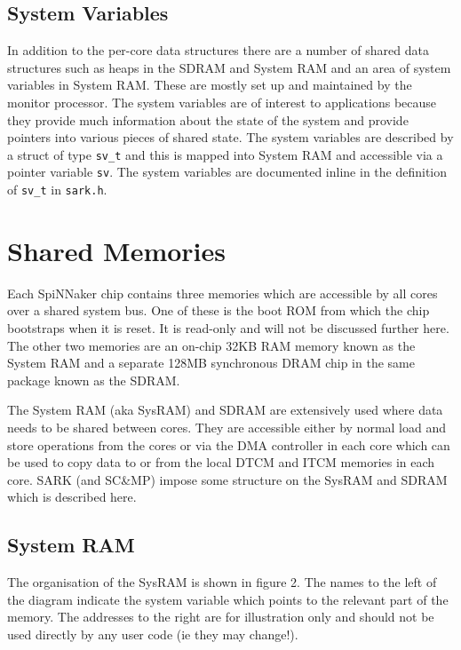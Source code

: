 \subsection{System Variables}

In addition to the per-core data structures there are a number of
shared data structures such as heaps in the SDRAM and System RAM and
an area of system variables in System RAM. These are mostly set up and
maintained by the monitor processor. The system variables are of
interest to applications because they provide much information about
the state of the system and provide pointers into various pieces of
shared state. The system variables are described by a struct of type
\texttt{sv\_t} and this is mapped into System RAM and accessible via
a pointer variable \texttt{sv}. The system variables are documented
inline in the definition of \texttt{sv\_t} in \texttt{sark.h}.

\section{Shared Memories}

Each SpiNNaker chip contains three memories which are accessible by
all cores over a shared system bus. One of these is the boot ROM from
which the chip bootstraps when it is reset. It is read-only and will
not be discussed further here. The other two memories are an on-chip
32KB RAM memory known as the System RAM and a separate 128MB
synchronous DRAM chip in the same package known as the SDRAM.

The System RAM (aka SysRAM) and SDRAM are extensively used where data
needs to be shared between cores. They are accessible either by normal
load and store operations from the cores or via the DMA controller in
each core which can be used to copy data to or from the local DTCM and
ITCM memories in each core. SARK (and SC\&MP) impose some structure on
the SysRAM and SDRAM which is described here.

\subsection{System RAM}

The organisation of the SysRAM is shown in figure 2. The names to the
left of the diagram indicate the system variable which points to the
relevant part of the memory. The addresses to the right are for
illustration only and should not be used directly by any user code (ie
they may change!).

